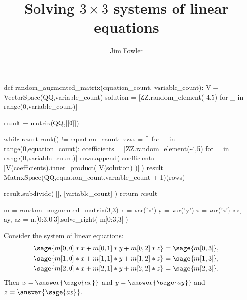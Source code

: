 \documentclass{ximera}
\title{Solving $3 \times 3$ systems of linear equations}
\author{Jim Fowler}
\begin{document}
\begin{sagesilent}
def random_augmented_matrix(equation_count, variable_count):
    V = VectorSpace(QQ,variable_count)
    solution = [ZZ.random_element(-4,5) for _ in range(0,variable_count)]

    result = matrix(QQ,[[0]])

    while result.rank() != equation_count:
        rows = []
        for _ in range(0,equation_count):
            coefficients = [ZZ.random_element(-4,5) for _ in range(0,variable_count)]        
            rows.append( coefficients + [V(coefficients).inner_product( V(solution) )] )
        result = MatrixSpace(QQ,equation_count,variable_count + 1)(rows)

    result.subdivide( [], [variable_count] )
    return result

m = random_augmented_matrix(3,3)
x = var('x')
y = var('y')
z = var('z')
ax, ay, az = m[0:3,0:3].solve_right( m[0:3,3] )
\end{sagesilent}

\begin{problem}
  Consider the system of linear equations:
  \begin{align*}
    \sage{m[0,0] * x + m[0,1] * y + m[0,2] * z} &= \sage{m[0,3]}, \\
    \sage{m[1,0] * x + m[1,1] * y + m[1,2] * z} &= \sage{m[1,3]}, \\
    \sage{m[2,0] * x + m[2,1] * y + m[2,2] * z} &= \sage{m[2,3]}.
  \end{align*}
  Then $x = \answer{\sage{ax}}$ and $y = \answer{\sage{ay}}$ and $z = \answer{\sage{az}}$.
\end{problem}
\end{document}
